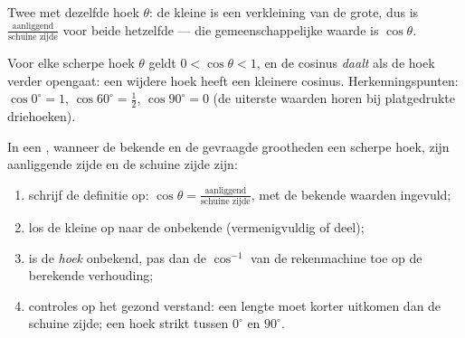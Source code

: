\begin{omfigure}

{\small Twee  met dezelfde hoek $\theta$: de kleine is een
verkleining van de grote, dus is
$\frac{\text{aanliggend}}{\text{schuine zijde}}$ voor beide hetzelfde --- die
gemeenschappelijke waarde is $\cos\theta$.}
\end{omfigure}

\begin{proposition}\label{prop:g8:cosine:bounds}
Voor elke scherpe hoek $\theta$ geldt $0 < \cos\theta < 1$, en de cosinus
\emph{daalt} als de hoek verder opengaat: een wijdere hoek heeft een kleinere
cosinus. Herkenningspunten: $\cos 0^\circ = 1$, $\cos 60^\circ = \frac12$,
$\cos 90^\circ = 0$ (de uiterste waarden horen bij platgedrukte driehoeken).
\end{proposition}
\admitted

\begin{method}\label{met:g8:cosine:use}
In een , wanneer de bekende en de gevraagde grootheden een
scherpe hoek, zijn aanliggende zijde en de schuine zijde zijn:
\begin{enumerate}
  \item schrijf de definitie op:
        $\cos\theta = \frac{\text{aanliggend}}{\text{schuine zijde}}$, met de
        bekende waarden ingevuld;
  \item los de kleine  op naar de onbekende (vermenigvuldig of deel);
  \item is de \emph{hoek} onbekend, pas dan de $\cos^{-1}$ van de rekenmachine
        toe op de berekende verhouding;
  \item controles op het gezond verstand: een lengte moet korter uitkomen dan de
        schuine zijde; een hoek strikt tussen $0^\circ$ en $90^\circ$.
\end{enumerate}
\end{method}

